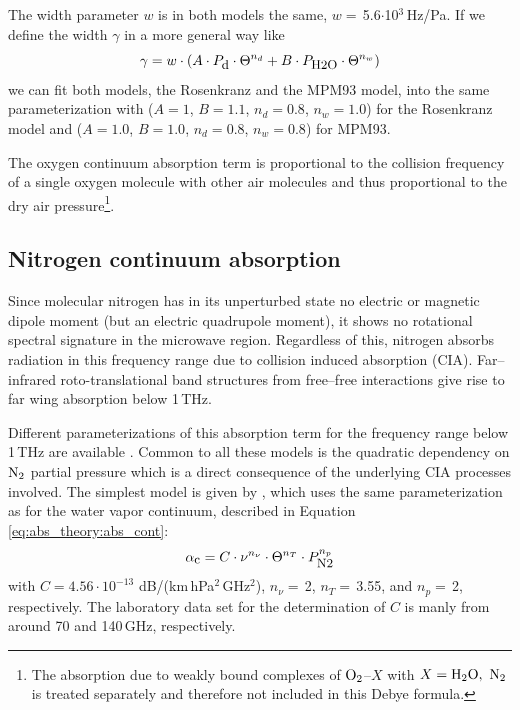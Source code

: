 The width parameter $w$ is in both models the same, 
$w =$\,5.6$\cdot$10$^{3}$\,Hz/Pa. If we define the width $\gamma$ in a more 
general way like
\begin{equation} 
 \label{eq:abs_theory:o2_cont_gamma_general}
 \gamma = w \cdot \left( A \cdot P_{\mbox{\rm \small d}}  \cdot \Theta^{n_d} + 
                   B \cdot P_{\mbox{\rm \small H2O}} \cdot \Theta^{n_w} \right) 
\end{equation}
we can fit both models, the Rosenkranz and the MPM93 model, into the 
same parameterization with ($A=1$, $B=1.1$, $n_d=0.8$, $n_w=1.0$) for 
the Rosenkranz model and ($A=1.0$, $B=1.0$, $n_d=0.8$, $n_w=0.8$) for 
MPM93.

The oxygen continuum absorption term is proportional to 
the collision frequency of a single oxygen molecule with other air molecules 
and thus proportional to the dry air pressure\footnote{The absorption
  due to weakly bound complexes of $\mbox{O}_2$--$X$ with $X=\mbox{H}_2\mbox{O},~\mbox{N}_2$ is 
  treated separately and therefore not included in this Debye formula.}.




\subsection{Nitrogen continuum absorption}
\label{levelc:n2cont}
Since molecular nitrogen has in its unperturbed state no electric or 
magnetic dipole moment (but an electric quadrupole moment), it shows 
no rotational spectral signature in the microwave region. Regardless 
of this, nitrogen absorbs radiation in this frequency range due to 
collision induced absorption (CIA). Far--infrared roto-translational
band structures from free--free interactions give rise to far wing
absorption below 1\,THz.

Different parameterizations of this absorption term for the 
frequency range below 1\,THz are available 
\citet{pwr:93,liebeetal:93,borysow:86}. Common to all these 
models is the quadratic dependency on $\mbox{N}_2$ partial pressure which is 
a direct consequence of the underlying CIA processes involved.
The simplest model is given by \citet{pwr:93}, which uses 
the same parameterization as for the water vapor continuum, described 
in Equation \ref{eq:abs_theory:abs_cont}:
\begin{equation}
  \label{eq:abs_theory:abs_cont_pwr_n2}
    \alpha_{\mbox{\small c}} =  C \cdot \nu^{n_{\nu}} \cdot \Theta^{n_T} \cdot P_{\mbox{\rm \small N2}}^{n_p}
\end{equation}
with $C = 4.56\cdot 10^{-13}$ dB/(km\,hPa$^2$\,GHz$^2$), $n_{\nu}=$\,2, 
$n_T=$\,3.55, and $n_p=$\,2, respectively. The laboratory data set 
for the determination of $C$ is manly from \citet{dagg:75,dagg:78} 
around 70 and 140\,GHz, respectively.

